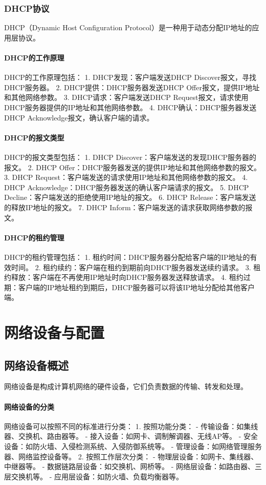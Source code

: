 \documentclass{book}
\begin{document}
\subsection{DHCP协议}
DHCP（Dynamic Host Configuration Protocol）是一种用于动态分配IP地址的应用层协议。
\subsubsection{DHCP的工作原理}
DHCP的工作原理包括：
1. DHCP发现：客户端发送DHCP Discover报文，寻找DHCP服务器。
2. DHCP提供：DHCP服务器发送DHCP Offer报文，提供IP地址和其他网络参数。
3. DHCP请求：客户端发送DHCP Request报文，请求使用DHCP服务器提供的IP地址和其他网络参数。
4. DHCP确认：DHCP服务器发送DHCP Acknowledge报文，确认客户端的请求。
\subsubsection{DHCP的报文类型}
DHCP的报文类型包括：
1. DHCP Discover：客户端发送的发现DHCP服务器的报文。
2. DHCP Offer：DHCP服务器发送的提供IP地址和其他网络参数的报文。
3. DHCP Request：客户端发送的请求使用IP地址和其他网络参数的报文。
4. DHCP Acknowledge：DHCP服务器发送的确认客户端请求的报文。
5. DHCP Decline：客户端发送的拒绝使用IP地址的报文。
6. DHCP Release：客户端发送的释放IP地址的报文。
7. DHCP Inform：客户端发送的请求获取网络参数的报文。
\subsubsection{DHCP的租约管理}
DHCP的租约管理包括：
1. 租约时间：DHCP服务器分配给客户端的IP地址的有效时间。
2. 租约续约：客户端在租约到期前向DHCP服务器发送续约请求。
3. 租约释放：客户端在不再使用IP地址时向DHCP服务器发送释放请求。
4. 租约过期：客户端的IP地址租约到期后，DHCP服务器可以将该IP地址分配给其他客户端。

\chapter{网络设备与配置}
\section{网络设备概述}
网络设备是构成计算机网络的硬件设备，它们负责数据的传输、转发和处理。
\subsubsection{网络设备的分类}
网络设备可以按照不同的标准进行分类：
1. 按照功能分类：
   - 传输设备：如集线器、交换机、路由器等。
   - 接入设备：如网卡、调制解调器、无线AP等。
   - 安全设备：如防火墙、入侵检测系统、入侵防御系统等。
   - 管理设备：如网络管理服务器、网络监控设备等。
2. 按照工作层次分类：
   - 物理层设备：如网卡、集线器、中继器等。
   - 数据链路层设备：如交换机、网桥等。
   - 网络层设备：如路由器、三层交换机等。
   - 应用层设备：如防火墙、负载均衡器等。
\end{document}
